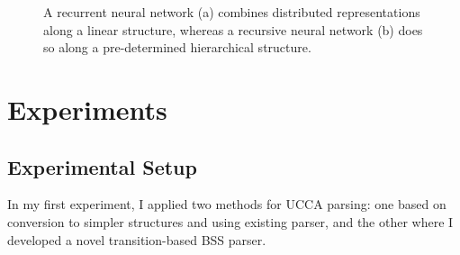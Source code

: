 \documentclass[12pt]{article}
\begin{document}
\begin{figure}[ht!]\small
  \begin{subfigure}{\textwidth}
  \parbox{.2\textwidth}{\caption{}\label{fig:rnn}}
  \parbox{.8\textwidth}{
  \centering
  }
  \end{subfigure}
  \begin{subfigure}{\textwidth}
  \parbox{.2\textwidth}{\caption{}\label{fig:recnn}}
  \parbox{.8\textwidth}{
  \centering
  }
  \end{subfigure}
  \caption{\label{fig:nns}
    A recurrent neural network (a) combines distributed representations along a
    linear structure, whereas a recursive neural network (b) does so along a
    pre-determined hierarchical structure.
  }
\end{figure}


\section{Experiments}\label{sec:experiments}

\subsection{Experimental Setup}\label{sec:setup}

In my first experiment, I applied two methods for UCCA parsing:
one based on conversion to simpler structures and using existing parser,
and the other where I developed a novel transition-based BSS parser.
\end{document}
